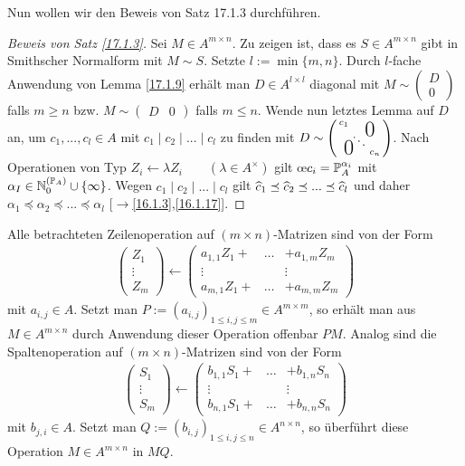 \documentclass[../../main.tex]{subfiles}
\begin{document}
\begin{bewna}\label{17.1.11}
Nun wollen wir den Beweis von Satz 17.1.3 durchf\"uhren.
\begin{proof}[Beweis von Satz \ref{17.1.3}]
Sei $M\in A^{m\times n}$. Zu zeigen ist, dass es $S\in A^{m\times n}$ gibt in Smithscher Normalform mit $M\sim S$. Setzte $l:=\min\{m,n\}$. Durch $l$-fache Anwendung von Lemma \ref{17.1.9} erhält man $D\in A^{l\times l}$ diagonal mit $M\sim\begin{pmatrix}D\\0\end{pmatrix}$ falls $m\ge n$ bzw. $M\sim \begin{pmatrix}D&0\end{pmatrix}$ falls $m\le n$. Wende nun letztes Lemma auf $D$ an, um $c_1,...,c_l\in A$ mit $c_1\mid c_2\mid...\mid c_l$ zu finden mit $D\sim \left(\begin{smallmatrix}
c_1 & & \llap{$\overset{\blap{\LARGE 0}}{~}$} \\
& \ddots &\\
\rlap{\tlap{\LARGE 0}} & & c_n
\end{smallmatrix}\right)$. Nach Operationen von Typ $Z_i\leftarrow \lambda Z_i\qquad (\lambda\in A^\times)$ gilt \oe $c_i=\P_A^{\alpha_i}$ mit $\alpha_I\in \expfam\cup\{\infty\}$. Wegen $c_1\mid c_2\mid...\mid c_l$ gilt $\tc c_1\preceq \tc c_2\preceq...\preceq \tc c_l$ und daher $\alpha_1\preceq \alpha_2\preceq...\preceq \alpha_l$ [$\to$\ref{16.1.3},\ref{16.1.17}].
\end{proof}
\end{bewna}

\noindent Alle betrachteten Zeilenoperation auf $(m\times n)$-Matrizen sind von der Form
\begin{align*}
\begin{pmatrix}Z_1\\\vdots\\ Z_m\end{pmatrix}\leftarrow\begin{pmatrix}a_{1,1}Z_1+&\hdots&+a_{1,m}Z_m\\\vdots&&\vdots\\ a_{m,1}Z_1+&\hdots&+a_{m,m}Z_m\end{pmatrix}
\end{align*}
mit $a_{i,j}\in A$. Setzt man $P:=(a_{i,j})_{1\le i,j\le m}\in A^{m\times m}$, so erhält man aus $M\in A^{m\times n}$ durch Anwendung dieser Operation offenbar $PM$. Analog sind die Spaltenoperation auf $(m\times n)$-Matrizen sind von der Form
\begin{align*}
\begin{pmatrix}S_1\\\vdots\\ S_m\end{pmatrix}\leftarrow\begin{pmatrix}b_{1,1}S_1+&\hdots&+b_{1,n}S_n\\\vdots&&\vdots\\ b_{n,1}S_1+&\hdots&+b_{n,n}S_n\end{pmatrix}
\end{align*}
mit $b_{j,i}\in A$. Setzt man $Q:=(b_{i,j})_{1\le i,j\le n}\in A^{n\times n}$, so überführt diese Operation $M\in A^{m\times n}$ in $MQ$.
\end{document}
